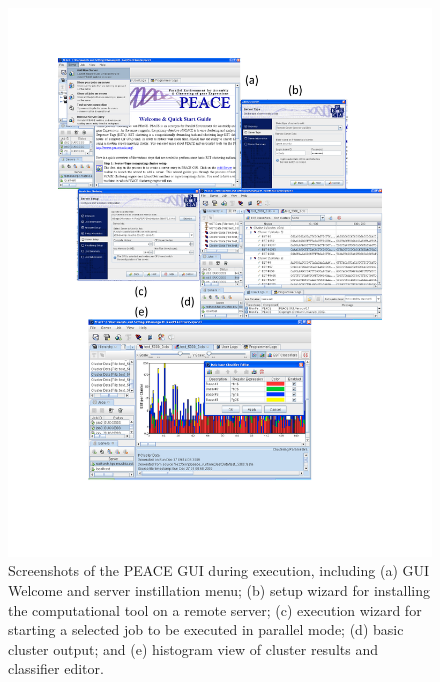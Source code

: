 \documentclass[a4,center,fleqn]{NAR}
\begin{document}
\begin{figure}[b]
\centerline{
\includegraphics[trim=0cm 3cm 0cm 1cm, clip, scale=0.9]{screen.d/screen.pdf} 
}
\label{screen}
\caption{Screenshots of the PEACE GUI during execution, including (a)
GUI Welcome and server instillation menu; (b) setup wizard for
installing the computational tool on a remote server; (c) execution
wizard for starting a selected job to be executed in parallel mode;
(d) basic cluster output; and (e) histogram view of cluster results
and classifier editor.}
\end{figure}
\end{document}
